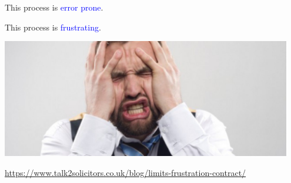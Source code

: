 \documentclass{beamer}
\begin{document}
\begin{frame}

This process is \textcolor{blue}{error prone}.

\begin{center}
%
%
\end{center}

\end{frame}
\begin{frame}

This process is \textcolor{blue}{frustrating}.

\begin{center}
\includegraphics[width=0.95\textwidth]{figures/frustrating}
\end{center}

\vfill
\tiny{\url{https://www.talk2solicitors.co.uk/blog/limits-frustration-contract/}}

\end{frame}
\end{document}
